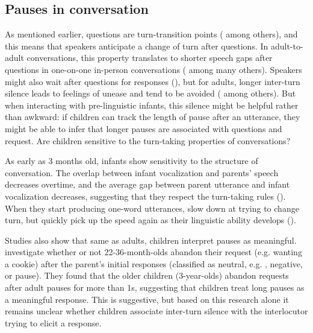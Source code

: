 \subsection{Pauses in conversation}
\label{sec:engsp:bg:pause}
As mentioned earlier, questions are turn-transition points (\cite{duncan1972turn} among others), and this means that speakers anticipate a change of turn after questions. In adult-to-adult conversations, this property translates to shorter speech gaps after questions in one-on-one in-person conversations (\cite{stivers2010,enfield2010,hilbrink2013turn} among many others). Speakers might also wait after questions for responses (\cite{sacks1978pause}), but for adults, longer inter-turn silence leads to feelings of unease and tend to be avoided (\cite{roberts2006pause} among others). But when interacting with pre-linguistic infants, this silence might be helpful rather than awkward: if children can track the length of pause after an utterance, they might be able to infer that longer pauses are associated with questions and request. Are children sensitive to the turn-taking properties of conversations? 

As early as 3 months old, infants show sensitivity to the structure of conversation. The overlap between infant vocalization and parents' speech decreases overtime, and the average gap between parent utterance and infant vocalization decreases, suggesting that they respect the turn-taking rules (\cite{hilbrink2013turn3mo}). When they start producing one-word utterances, slow down at trying to change turn, but quickly pick up the speed again as their linguistic ability develops (\cite{hilbrink2013turn}).

Studies also show that same as adults, children interpret pauses as meaningful. \textcite{craiggallagher1983pause} 
investigate whether or not 22-36-month-olds abandon their request (e.g. wanting a cookie) after the parent's initial responses (classified as neutral, e.g. ,  negative,  or pause). They found that the older children (3-year-olds) abandon requests after adult pauses for more than 1s, suggesting that children treat long pauses as a meaningful response. This is suggestive, but based on this research alone it remains unclear whether children associate inter-turn silence with the interlocutor trying to elicit a response. 

